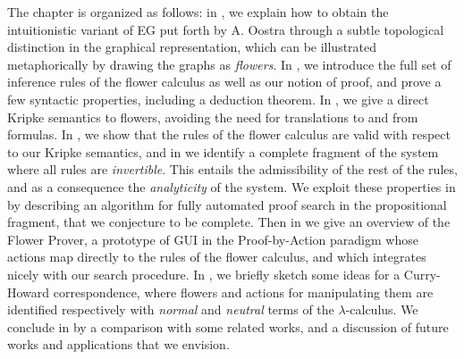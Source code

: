 The chapter is organized as follows: in , we explain how to
obtain the intuitionistic variant of EG put forth by A. Oostra
\cite{oostra_graficos_2010} through a subtle topological distinction in the
graphical representation, which can be illustrated metaphorically by drawing the
graphs as \emph{flowers}. In , we introduce the full set of
inference rules of the flower calculus as well as our notion of proof, and prove
a few syntactic properties, including a deduction theorem. In
, we give a direct Kripke semantics to flowers, avoiding the
need for translations to and from formulas. In , we show that
the rules of the flower calculus are valid with respect to our Kripke semantics,
and in  we identify a complete fragment of the system where
all rules are \emph{invertible}. This entails the admissibility of the rest of
the rules, and as a consequence the \emph{analyticity} of the system. We exploit
these properties in  by describing an algorithm for fully
automated proof search in the propositional fragment, that we conjecture to be
complete. Then in  we give an overview of the Flower
Prover, a prototype of GUI in the Proof-by-Action paradigm whose actions map
directly to the rules of the flower calculus, and which integrates nicely with
our search procedure. In , we briefly sketch some
ideas for a Curry-Howard correspondence, where flowers and actions for
manipulating them are identified respectively with \emph{normal} and
\emph{neutral} terms of the $\lambda$-calculus. We conclude in
 by a comparison with some related works, and a discussion of
future works and applications that we envision.




